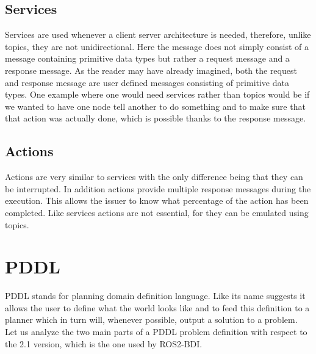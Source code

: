 \subsection{Services}
Services are used whenever a client server architecture is needed, therefore, unlike topics, they are not unidirectional. Here the message does not simply consist of a message containing primitive data types but rather a request message and a response message. As the reader may have already imagined, both the request and response message are user defined messages consisting of primitive data types. One example where one would need services rather than topics would be if we wanted to have one node tell another to do something and to make sure that that action was actually done, which is possible thanks to the response message.
\subsection{Actions}
Actions are very similar to services with the only difference being that they can be interrupted. In addition actions provide multiple response messages during the execution. This allows the issuer to know what percentage of the action has been completed. Like services actions are not essential, for they can be emulated using topics.
\cite{ros2_docs}
\cite{ros2_website}
\section{PDDL}
PDDL stands for planning domain definition language. Like its name suggests it allows the user to define what the world looks like and to feed this definition to a planner which in turn will, whenever possible, output a solution to a problem.
Let us analyze the two main parts of a PDDL problem definition with respect to the 2.1 version, which is the one used by ROS2-BDI.
